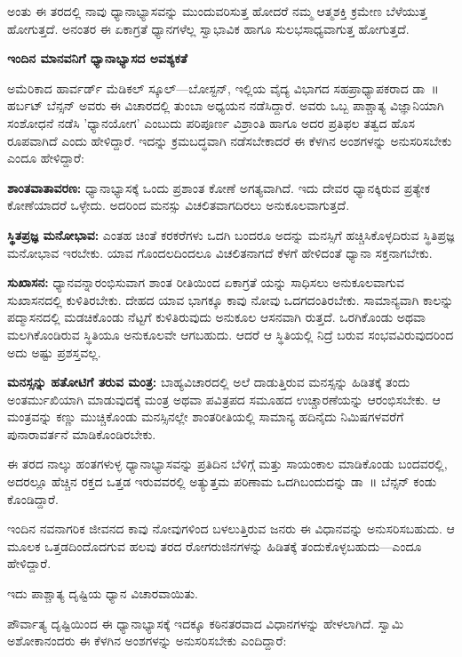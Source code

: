 ಅಂತು ಈ ತರದಲ್ಲಿ ನಾವು ಧ್ಯಾನಾಭ್ಯಾಸವನ್ನು ಮುಂದುವರಿಸುತ್ತ ಹೋದರೆ ನಮ್ಮ ಆತ್ಮಶಕ್ತಿ ಕ್ರಮೇಣ ಬೆಳೆಯುತ್ತ ಹೋಗುತ್ತದೆ. ಅನಂತರ ಈ ಏಕಾಗ್ರತೆ ಧ್ಯಾನಗಳೆಲ್ಲ ಸ್ವಾಭಾವಿಕ ಹಾಗೂ ಸುಲಭಸಾಧ್ಯವಾಗುತ್ತ ಹೋಗುತ್ತದೆ.

\textbf{ಇಂದಿನ ಮಾನವನಿಗೆ ಧ್ಯಾನಾಭ್ಯಾಸದ ಅವಶ್ಯಕತೆ}

ಅಮೆರಿಕಾದ ಹಾರ್ವರ್ಡ್ ಮೆಡಿಕಲ್ ಸ್ಕೂಲ್​—ಬೋಸ್ಟನ್, ಇಲ್ಲಿಯ ವೈದ್ಯ ವಿಭಾಗದ ಸಹಪ್ರಾಧ್ಯಾಪಕರಾದ ಡಾ~॥ ಹರ್ಬಟ್ ಬೆನ್ಸನ್ ಅವರು ಈ ವಿಚಾರದಲ್ಲಿ ತುಂಬಾ ಅಧ್ಯಯನ ನಡೆಸಿದ್ದಾರೆ. ಅವರು ಒಬ್ಬ ಪಾಶ್ಚಾತ್ಯ ವಿಜ್ಞಾನಿಯಾಗಿ ಸಂಶೋಧನೆ ನಡೆಸಿ 'ಧ್ಯಾನಯೋಗ' ಎಂಬುದು ಪರಿಪೂರ್ಣ ವಿಶ್ರಾಂತಿ ಹಾಗೂ ಅದರ ಪ್ರತಿಫಲ  ತತ್ವದ ಹೊಸ ರೂಪವಾಗಿದೆ ಎಂದು ಹೇಳಿದ್ದಾರೆ. ಇದನ್ನು ಕ್ರಮಬದ್ಧವಾಗಿ ನಡೆಸಬೇಕಾದರೆ ಈ ಕೆಳಗಿನ ಅಂಶಗಳನ್ನು ಅನುಸರಿಸಬೇಕು ಎಂದೂ ಹೇಳಿದ್ದಾರೆ:

 \textbf{ಶಾಂತವಾತಾವರಣ:} ಧ್ಯಾನಾಭ್ಯಾಸಕ್ಕೆ ಒಂದು ಪ್ರಶಾಂತ ಕೋಣೆ ಅಗತ್ಯವಾಗಿದೆ. ಇದು ದೇವರ ಧ್ಯಾನಕ್ಕಿರುವ ಪ್ರತ್ಯೇಕ ಕೋಣೆಯಾದರೆ ಒಳ್ಳೇದು. ಅದರಿಂದ ಮನಸ್ಸು ವಿಚಲಿತವಾಗದಿರಲು ಅನುಕೂಲವಾಗುತ್ತದೆ.

 \textbf{ಸ್ಥಿತಪ್ರಜ್ಞ ಮನೋಭಾವ:} ಎಂತಹ ಚಿಂತೆ ಕರಕರೆಗಳು ಒದಗಿ ಬಂದರೂ ಅದನ್ನು ಮನಸ್ಸಿಗೆ ಹಚ್ಚಿಸಿಕೊಳ್ಳದಿರುವ ಸ್ಥಿತಿಪ್ರಜ್ಞ ಮನೋಭಾವ ಇರಬೇಕು. ಯಾವ ಗೊಂದಲದಿಂದಲೂ ವಿಚಲಿತನಾಗದೆ ಕೆಳಗೆ ಹೇಳಿದಂತೆ ಧ್ಯಾನಾ ಸಕ್ತನಾಗಬೇಕು.

 \textbf{ಸುಖಾಸನ:} ಧ್ಯಾನವನ್ನಾರಂಭಿಸುವಾಗ ಶಾಂತ ರೀತಿಯಿಂದ ಏಕಾಗ್ರತೆ ಯನ್ನು ಸಾಧಿಸಲು ಅನುಕೂಲವಾಗುವ ಸುಖಾಸನದಲ್ಲಿ ಕುಳಿತಿರಬೇಕು. ದೇಹದ ಯಾವ ಭಾಗಕ್ಕೂ ಕಾವು ನೋವು ಒದಗದಂತಿರಬೇಕು. ಸಾಮಾನ್ಯವಾಗಿ ಕಾಲನ್ನು ಪದ್ಮಾಸನದಲ್ಲಿ ಮಡಚಿಕೊಂಡು ನೆಟ್ಟಗೆ ಕುಳಿತಿರುವುದು ಅನುಕೂಲ ಆಸನವಾಗಿ ರುತ್ತದೆ. ಒರಗಿಕೊಂಡು ಅಥವಾ ಮಲಗಿಕೊಂಡಿರುವ ಸ್ಥಿತಿಯೂ ಅನುಕೂಲವೇ ಆಗಬಹುದು. ಆದರೆ ಆ ಸ್ಥಿತಿಯಲ್ಲಿ ನಿದ್ರೆ ಬರುವ ಸಂಭವವಿರುವುದರಿಂದ ಅದು ಅಷ್ಟು ಪ್ರಶಸ್ತವಲ್ಲ.

 \textbf{ಮನಸ್ಸನ್ನು ಹತೋಟಿಗೆ ತರುವ ಮಂತ್ರ:} ಬಾಹ್ಯವಿಚಾರದಲ್ಲಿ ಅಲೆ ದಾಡುತ್ತಿರುವ ಮನಸ್ಸನ್ನು ಹಿಡಿತಕ್ಕೆ ತಂದು ಅಂತರ್ಮುಖಿಯಾಗಿ ಮಾಡುವುದಕ್ಕೆ ಮಂತ್ರ ಅಥವಾ ಪವಿತ್ರಪದ ಸಮೂಹದ ಉಚ್ಚಾರಣೆಯನ್ನು ಆರಂಭಿಸಬೇಕು. ಆ ಮಂತ್ರವನ್ನು ಕಣ್ಣು ಮುಚ್ಚಿಕೊಂಡು ಮನಸ್ಸಿನಲ್ಲೇ ಶಾಂತರೀತಿಯಲ್ಲಿ ಸಾಮಾನ್ಯ ಹದಿನೈದು ನಿಮಿಷಗಳವರೆಗೆ ಪುನಾರಾವರ್ತನೆ ಮಾಡಿಕೊಂಡಿರಬೇಕು.

ಈ ತರದ ನಾಲ್ಕು ಹಂತಗಳುಳ್ಳ ಧ್ಯಾನಾಭ್ಯಾಸವನ್ನು ಪ್ರತಿದಿನ ಬೆಳಿಗ್ಗೆ ಮತ್ತು ಸಾಯಂಕಾಲ ಮಾಡಿಕೊಂಡು ಬಂದವರಲ್ಲಿ, ಅದರಲ್ಲೂ ಹೆಚ್ಚಿನ ರಕ್ತದ ಒತ್ತಡ ಇರುವವರಲ್ಲಿ ಅತ್ಯುತ್ತಮ ಪರಿಣಾಮ ಒದಗಿಬಂದುದನ್ನು ಡಾ~॥ ಬೆನ್ಸನ್ ಕಂಡು ಕೊಂಡಿದ್ದಾರೆ.

ಇಂದಿನ ನವನಾಗರಿಕ ಜೀವನದ ಕಾವು ನೋವುಗಳಿಂದ ಬಳಲುತ್ತಿರುವ ಜನರು ಈ ವಿಧಾನವನ್ನು ಅನುಸರಿಸಬಹುದು. ಆ ಮೂಲಕ ಒತ್ತಡದಿಂದೊದಗುವ ಹಲವು ತರದ ರೋಗರುಜಿನಗಳನ್ನು ಹಿಡಿತಕ್ಕೆ ತಂದುಕೊಳ್ಳಬಹುದು—ಎಂದೂ ಹೇಳಿದ್ದಾರೆ.

ಇದು ಪಾಶ್ಚಾತ್ಯ ದೃಷ್ಟಿಯ ಧ್ಯಾನ ವಿಚಾರವಾಯಿತು.

ಪೌರ್ವಾತ್ಯ ದೃಷ್ಟಿಯಿಂದ ಈ ಧ್ಯಾನಾಭ್ಯಾಸಕ್ಕೆ ಇದಕ್ಕೂ ಕಠಿನತರವಾದ ವಿಧಾನಗಳನ್ನು ಹೇಳಲಾಗಿದೆ. ಸ್ವಾಮಿ ಅಶೋಕಾನಂದರು ಈ ಕೆಳಗಿನ ಅಂಶಗಳನ್ನು ಅನುಸರಿಸಬೇಕು ಎಂದಿದ್ದಾರೆ:

